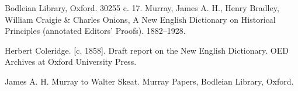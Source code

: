 \documentclass[output=paper,colorlinks,citecolor=brown,arabicfont,chinesefont]{langscibook}
\begin{document}
\begin{description}[font=\normalfont]
\item Bodleian Library, Oxford. 30255
c. 17. Murray, James A. H., Henry Bradley, William Craigie \& Charles Onions, A New
English Dictionary on Historical Principles (annotated Editors’ Proofs). 1882--1928.
\item[OED/B/1/1/2.] Herbert Coleridge. [c. 1858]. Draft report on the New English Dictionary. OED Archives at Oxford University Press. 
\item[MP/22/7/1912.] James A. H. Murray to Walter Skeat. Murray Papers, Bodleian Library, Oxford.

\end{description}

\printbibliography[heading=subbibliography,notkeyword=this]
\end{document}
